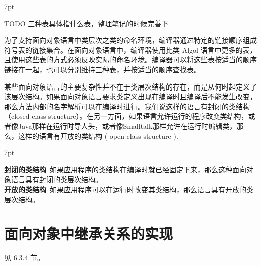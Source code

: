 \documentclass[12pt]{article}
\newenvironment{formal}{%
\def\FrameCommand{%
\hspace{1pt}%
{\color{DarkBlue}\vrule width 2pt}%
{\color{formalshade}\vrule width 4pt}%
\colorbox{formalshade}%
}%
\MakeFramed{\advance\hsize-\width\FrameRestore}%
\noindent\hspace{-4.55pt}%
\begin{adjustwidth}{}{7pt}%
\vspace{2pt}\vspace{2pt}%
}
{%
\vspace{2pt}\end{adjustwidth}\endMakeFramed%
}
\begin{document}
\begin{formal}
TODO 三种表具体指什么表，整理笔记的时候完善下
\end{formal}
为了支持面向对象语言中类层次之类的命名环境，编译器通过特定的链接顺序组成符号表的链接集合。在面向对象语言中，编译器使用比类 Algol 语言中更多的表，且使用这些表的方式必须反映实际的命名环境。编译器可以将这些表按适当的顺序链接在一起，也可以分别维持三种表，并按适当的顺序查找表。

某些面向对象语言的主要复杂性并不在于类层次结构的存在，而是从何时起定义了该层次结构。如果面向对象语言要求类定义出现在编译时且编译后不能发生改变，那么方法内部的名字解析可以在编译时进行。我们说这样的语言有封闭的类结构（closed class structure）。在另一方面，如果语言允许运行的程序改变类结构，或者像Java那样在运行时导人头，或者像Smalltalk那样允许在运行时编辑类，那么，这样的语言有开放的类结构 ( open class structure ).

\begin{formal}
\textbf{封闭的类结构}\ 如果应用程序的类结构在编译时就已经固定下来，那么这种面向对象语言具有封闭的类层次结构。\\
\textbf{开放的类结构}\ 如果应用程序可以在运行时改变其类结构，那么语言具有开放的类层次结构。
\end{formal}

\section*{面向对象中继承关系的实现}

见 6.3.4 节。
\end{document}
